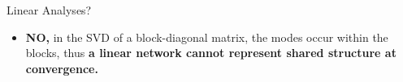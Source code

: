 \documentclass{beamer}
\begin{document}
\begin{frame}{Linear Analyses?}
\begin{itemize}
    \item<1-> \textbf{NO,} in the SVD of a block-diagonal matrix, the modes occur within the blocks, thus \textbf{a linear network cannot represent shared structure at convergence.}
\end{itemize}
\end{frame}
\end{document}
